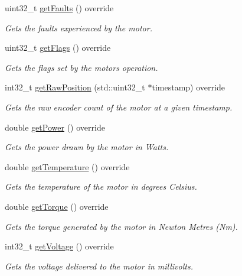 \begin{DoxyCompactItemize}
uint32\+\_\+t \mbox{\hyperlink{classokapi_1_1MockMotor_a8381cd06b1cc9489d21a9e5bd4ed9e99}{get\+Faults}} () override
\begin{DoxyCompactList}\small\item\em Gets the faults experienced by the motor. \end{DoxyCompactList}\item 
uint32\+\_\+t \mbox{\hyperlink{classokapi_1_1MockMotor_ad3c5f7b39feb1744216adb7118721369}{get\+Flags}} () override
\begin{DoxyCompactList}\small\item\em Gets the flags set by the motor\textquotesingle{}s operation. \end{DoxyCompactList}\item 
int32\+\_\+t \mbox{\hyperlink{classokapi_1_1MockMotor_a218029c713cc871b010798dd0fa799a9}{get\+Raw\+Position}} (std\+::uint32\+\_\+t $\ast$timestamp) override
\begin{DoxyCompactList}\small\item\em Gets the raw encoder count of the motor at a given timestamp. \end{DoxyCompactList}\item 
double \mbox{\hyperlink{classokapi_1_1MockMotor_a64fc89d3dceff059614ea85c62d14a04}{get\+Power}} () override
\begin{DoxyCompactList}\small\item\em Gets the power drawn by the motor in Watts. \end{DoxyCompactList}\item 
double \mbox{\hyperlink{classokapi_1_1MockMotor_a3ce754d9d86a8c4a136c8f11edaf03d4}{get\+Temperature}} () override
\begin{DoxyCompactList}\small\item\em Gets the temperature of the motor in degrees Celsius. \end{DoxyCompactList}\item 
double \mbox{\hyperlink{classokapi_1_1MockMotor_a443e22ae0beef7ecb57ad73d13a36f9b}{get\+Torque}} () override
\begin{DoxyCompactList}\small\item\em Gets the torque generated by the motor in Newton Metres (Nm). \end{DoxyCompactList}\item 
int32\+\_\+t \mbox{\hyperlink{classokapi_1_1MockMotor_a9ae99f669a1d8c4de97205a155f69b6b}{get\+Voltage}} () override
\begin{DoxyCompactList}\small\item\em Gets the voltage delivered to the motor in millivolts. \end{DoxyCompactList}\item 

\end{DoxyCompactItemize}
